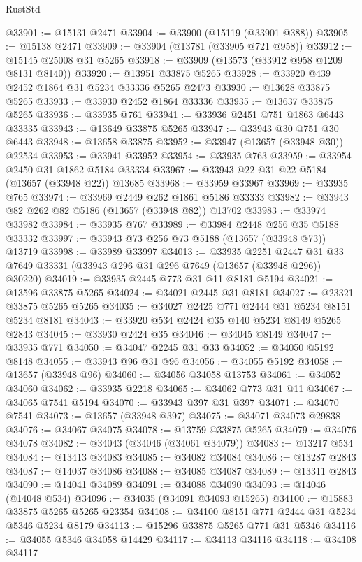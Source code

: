 \begin{lexlean}{RustStd}
\begin{coremodule}
@33901 := @15131 @2471
@33904 := @33900 (@15119 (@33901 @388))
@33905 := @15138 @2471
@33909 := @33904 (@13781 (@33905 @721 @958))
@33912 := @15145 @25008 @31 @5265
@33918 := @33909 (@13573 (@33912 @958 @1209 @8131 @8140))
@33920 := @13951 @33875 @5265
@33928 := @33920 @439 @2452 @1864 @31 @5234 @33336 @5265 @2473
@33930 := @13628 @33875 @5265
@33933 := @33930 @2452 @1864 @33336
@33935 := @13637 @33875 @5265
@33936 := @33935 @761
@33941 := @33936 @2451 @751 @1863 @6443 @33335
@33943 := @13649 @33875 @5265
@33947 := @33943 @30 @751 @30 @6443
@33948 := @13658 @33875
@33952 := @33947 (@13657 (@33948 @30)) @22534
@33953 := @33941 @33952
@33954 := @33935 @763
@33959 := @33954 @2450 @31 @1862 @5184 @33334
@33967 := @33943 @22 @31 @22 @5184 (@13657 (@33948 @22)) @13685
@33968 := @33959 @33967
@33969 := @33935 @765
@33974 := @33969 @2449 @262 @1861 @5186 @33333
@33982 := @33943 @82 @262 @82 @5186 (@13657 (@33948 @82)) @13702
@33983 := @33974 @33982
@33984 := @33935 @767
@33989 := @33984 @2448 @256 @35 @5188 @33332
@33997 := @33943 @73 @256 @73 @5188 (@13657 (@33948 @73)) @13719
@33998 := @33989 @33997
@34013 := @33935
    @2251
    @2447
    @31
    @33
    @7649
    @33331
    (@33943 @296 @31 @296 @7649 (@13657 (@33948 @296)) @30220)
@34019 := @33935 @2445 @773 @31 @11 @8181 @5194
@34021 := @13596 @33875 @5265
@34024 := @34021 @2445 @31 @8181
@34027 := @23321 @33875 @5265 @5265
@34035 := @34027 @2425 @771 @2444 @31 @5234 @8151 @5234 @8181
@34043 := @33920 @534 @2424 @35 @140 @5234 @8149 @5265 @2843
@34045 := @33930 @2424 @35
@34046 := @34045 @8149
@34047 := @33935 @771
@34050 := @34047 @2245 @31 @33
@34052 := @34050 @5192 @8148
@34055 := @33943 @96 @31 @96
@34056 := @34055 @5192
@34058 := @13657 (@33948 @96)
@34060 := @34056 @34058 @13753
@34061 := @34052 @34060
@34062 := @33935 @2218
@34065 := @34062 @773 @31 @11
@34067 := @34065 @7541 @5194
@34070 := @33943 @397 @31 @397
@34071 := @34070 @7541
@34073 := @13657 (@33948 @397)
@34075 := @34071 @34073 @29838
@34076 := @34067 @34075
@34078 := @13759 @33875 @5265
@34079 := @34076 @34078
@34082 := @34043 (@34046 (@34061 @34079))
@34083 := @13217 @534
@34084 := @13413 @34083
@34085 := @34082 @34084
@34086 := @13287 @2843
@34087 := @14037 @34086
@34088 := @34085 @34087
@34089 := @13311 @2843
@34090 := @14041 @34089
@34091 := @34088 @34090
@34093 := @14046 (@14048 @534)
@34096 := @34035 (@34091 @34093 @15265)
@34100 := @15883 @33875 @5265 @5265 @23354
@34108 := @34100 @8151 @771 @2444 @31 @5234 @5346 @5234 @8179
@34113 := @15296 @33875 @5265 @771 @31 @5346
@34116 := @34055 @5346 @34058 @14429
@34117 := @34113 @34116
@34118 := @34108 @34117

\end{coremodule}
\end{lexlean}
